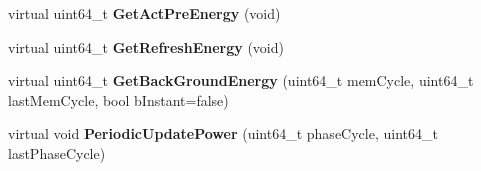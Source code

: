 \begin{DoxyCompactItemize}
\item 
\hypertarget{classMemChannelBase_acc0b3c449b8510255366da62f21b32a2}{virtual uint64\-\_\-t {\bfseries Get\-Act\-Pre\-Energy} (void)}\label{classMemChannelBase_acc0b3c449b8510255366da62f21b32a2}

\item 
\hypertarget{classMemChannelBase_a380b6b65ddbc0de0d9bb3ecc199d85c0}{virtual uint64\-\_\-t {\bfseries Get\-Refresh\-Energy} (void)}\label{classMemChannelBase_a380b6b65ddbc0de0d9bb3ecc199d85c0}

\item 
\hypertarget{classMemChannelBase_a9c734e2143117c54de9f98054dad2ca7}{virtual uint64\-\_\-t {\bfseries Get\-Back\-Ground\-Energy} (uint64\-\_\-t mem\-Cycle, uint64\-\_\-t last\-Mem\-Cycle, bool b\-Instant=false)}\label{classMemChannelBase_a9c734e2143117c54de9f98054dad2ca7}

\item 
\hypertarget{classMemChannelBase_a796fe1cfd947821d2127f1b2acd1541f}{virtual void {\bfseries Periodic\-Update\-Power} (uint64\-\_\-t phase\-Cycle, uint64\-\_\-t last\-Phase\-Cycle)}\label{classMemChannelBase_a796fe1cfd947821d2127f1b2acd1541f}

\end{DoxyCompactItemize}
